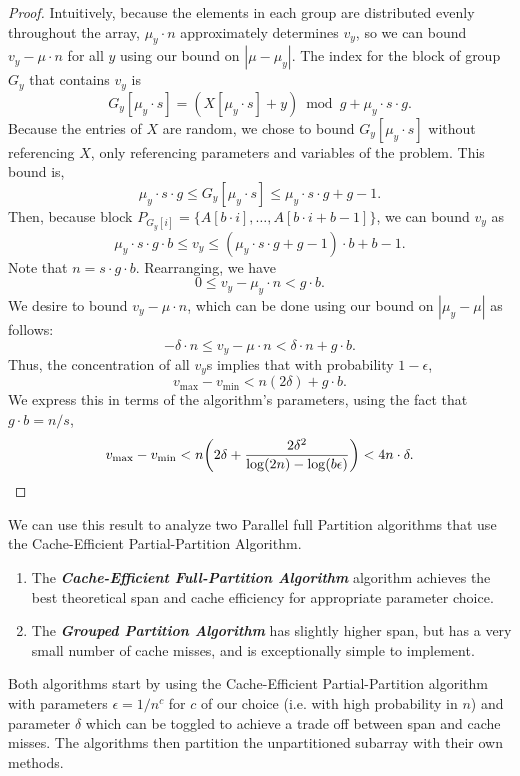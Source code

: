 \documentclass[twocolumn, twoside, 11pt]{article}
\DeclarePairedDelimiter{\paren}{(}{)}
\newcommand{\defn}[1]       {{\textit{\textbf{\boldmath #1}}}}
\begin{document}
\begin{proof}
	Intuitively, because the elements in each group are distributed evenly throughout the array, $\mu_y\cdot n$ approximately determines $v_y$, so we can bound $v_y-\mu\cdot n$ for all $y$ using our bound on $|\mu-\mu_y|$. 
	The index for the block of group $G_y$ that contains $v_y$ is $$G_y[\mu_y\cdot s]= (X[\mu_y \cdot s] + y) \bmod g + \mu_y \cdot s\cdot g.$$
	Because the entries of $X$ are random, we chose to bound $G_y[\mu_y\cdot s]$ without referencing $X$, only referencing parameters and variables of the problem.
	This bound is, 
	$$ \mu_y \cdot s\cdot g \leq G_y[\mu_y\cdot s] \leq  \mu_y \cdot s\cdot g + g-1.$$
	Then, because block $P_{G_y[i]} = \{A[b\cdot i], \ldots, A[b\cdot i + b-1]\}$, we can bound $v_y$ as $$\mu_y\cdot s\cdot g\cdot b \leq v_y \leq (\mu_y \cdot s\cdot g + g-1)\cdot b + b-1.$$
	Note that $n=s\cdot g\cdot b$. 
	Rearranging, we have 
	$$0 \leq v_y - \mu_y\cdot n < g\cdot b.$$
	We desire to bound $v_y - \mu\cdot n$, which can be done using our bound on $|\mu_y - \mu|$ as follows:
	$$ - \delta\cdot n \leq v_y - \mu\cdot n < \delta\cdot n + g\cdot b.$$
	Thus, the concentration of all $v_y$s implies that with probability $1-\epsilon$, 
	$$v_{\text{max}}-v_{\text{min}}<n(2\delta) + g\cdot b.$$ 
	We express this in terms of the algorithm's parameters, using the fact that $g\cdot b = n/s$, 
	$$v_{\text{max}}-v_{\text{min}}<n\paren*{2\delta + \frac{2\delta^2}{\log (2n) - \log(b\epsilon)}} < 4n\cdot\delta.$$ 
\end{proof}
We can use this result to analyze two Parallel full Partition algorithms that use the Cache-Efficient Partial-Partition Algorithm.

\begin{enumerate}
	\item The \defn{Cache-Efficient Full-Partition Algorithm} algorithm achieves the best theoretical span and cache efficiency for appropriate parameter choice.
	\item The \defn{Grouped Partition Algorithm} has slightly higher span, but has a very small number of cache misses, and is exceptionally simple to implement.
\end{enumerate}

Both algorithms start by using the Cache-Efficient Partial-Partition algorithm with parameters $\epsilon = 1/n^c$ for $c$ of our choice (i.e. with high probability in $n$) and parameter $\delta$ which can be toggled to achieve a trade off between span and cache misses. 
The algorithms then partition the unpartitioned subarray with their own methods.
\end{document}
